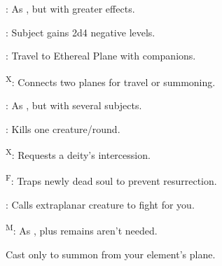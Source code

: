 : As , but with greater effects. %

: Subject gains 2d4 negative levels.

: Travel to Ethereal Plane with companions.

\textsuperscript{X}: Connects two planes for travel or summoning.

: As , but with several subjects.

: Kills one creature/round.

\textsuperscript{X}: Requests a deity's intercession.

\textsuperscript{F}: Traps newly dead soul to prevent resurrection.


\footnotemark[1]: Calls extraplanar creature to fight for you.

\textsuperscript{M}: As , plus remains aren't needed.

 Cast only to summon from your element's plane.

